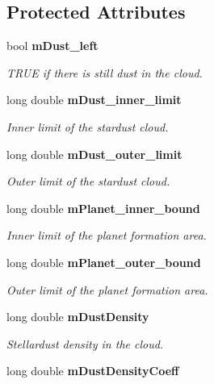 \subsection*{Protected Attributes}
\begin{CompactItemize}
\item 
bool {\bf m\-Dust\_\-left}\label{class_s_g___stardust_p0}

\begin{CompactList}\small\item\em TRUE if there is still dust in the cloud. \item\end{CompactList}\item 
long double {\bf m\-Dust\_\-inner\_\-limit}\label{class_s_g___stardust_p1}

\begin{CompactList}\small\item\em Inner limit of the stardust cloud. \item\end{CompactList}\item 
long double {\bf m\-Dust\_\-outer\_\-limit}\label{class_s_g___stardust_p2}

\begin{CompactList}\small\item\em Outer limit of the stardust cloud. \item\end{CompactList}\item 
long double {\bf m\-Planet\_\-inner\_\-bound}\label{class_s_g___stardust_p3}

\begin{CompactList}\small\item\em Inner limit of the planet formation area. \item\end{CompactList}\item 
long double {\bf m\-Planet\_\-outer\_\-bound}\label{class_s_g___stardust_p4}

\begin{CompactList}\small\item\em Outer limit of the planet formation area. \item\end{CompactList}\item 
long double {\bf m\-Dust\-Density}\label{class_s_g___stardust_p5}

\begin{CompactList}\small\item\em Stellardust density in the cloud. \item\end{CompactList}\item 
long double {\bf m\-Dust\-Density\-Coeff}\label{class_s_g___stardust_p6}


\end{CompactItemize}
